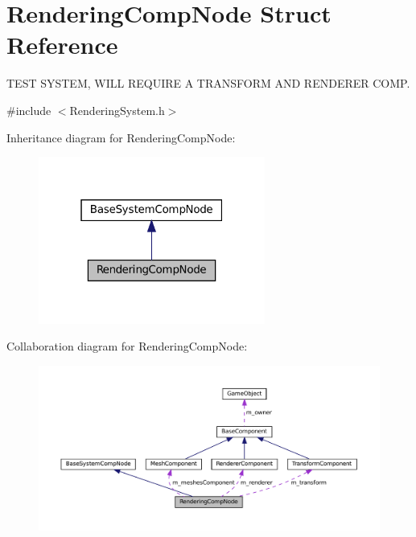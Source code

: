 \hypertarget{structRenderingCompNode}{}\section{Rendering\+Comp\+Node Struct Reference}
\label{structRenderingCompNode}


T\+E\+ST S\+Y\+S\+T\+EM, W\+I\+LL R\+E\+Q\+U\+I\+RE A T\+R\+A\+N\+S\+F\+O\+RM A\+ND R\+E\+N\+D\+E\+R\+ER C\+O\+MP.  




{\ttfamily \#include $<$Rendering\+System.\+h$>$}



Inheritance diagram for Rendering\+Comp\+Node\+:
\nopagebreak
\begin{figure}[H]
\begin{center}
\leavevmode
\includegraphics[width=211pt]{structRenderingCompNode__inherit__graph}
\end{center}
\end{figure}


Collaboration diagram for Rendering\+Comp\+Node\+:
\nopagebreak
\begin{figure}[H]
\begin{center}
\leavevmode
\includegraphics[width=350pt]{structRenderingCompNode__coll__graph}
\end{center}
\end{figure}
